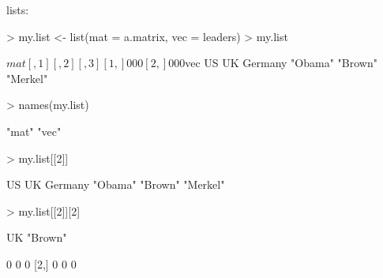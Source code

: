 \documentclass[handout]{beamer}
\newcommand{\red}{\color{red}}
\begin{document}
\begin{frame}[fragile]
lists:
\bigskip
\red
\footnotesize
\begin{Schunk}
\begin{Sinput}
> my.list <- list(mat = a.matrix, vec = leaders)
> my.list
\end{Sinput}
\begin{Soutput}
$mat
     [,1] [,2] [,3]
[1,]    0    0    0
[2,]    0    0    0

$vec
      US       UK  Germany 
 "Obama"  "Brown" "Merkel" 
\end{Soutput}
\end{Schunk}
\pause
\begin{Schunk}
\begin{Sinput}
> names(my.list)
\end{Sinput}
\begin{Soutput}
[1] "mat" "vec"
\end{Soutput}
\end{Schunk}
\end{frame}

\begin{frame}[fragile]
\red
\footnotesize
\begin{Schunk}
\begin{Sinput}
> my.list[[2]]
\end{Sinput}
\begin{Soutput}
      US       UK  Germany 
 "Obama"  "Brown" "Merkel" 
\end{Soutput}
\end{Schunk}
\pause
\bigskip
\begin{Schunk}
\begin{Sinput}
> my.list[[2]][2]
\end{Sinput}
\begin{Soutput}
     UK 
"Brown" 
\end{Soutput}
\end{Schunk}
\pause
\bigskip
\begin{Schunk}
\begin{Soutput}
     [,1] [,2] [,3]
[1,]    0    0    0
[2,]    0    0    0
\end{Soutput}
\end{Schunk}
\end{frame}
\end{document}
